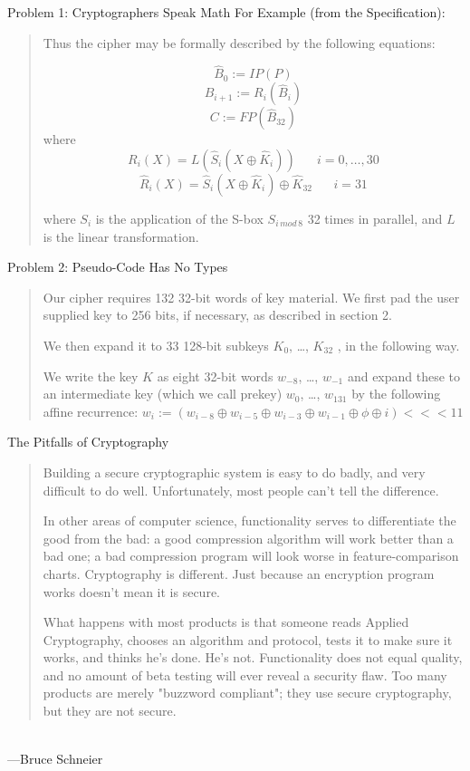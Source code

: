 \documentclass[style=sailor, mode=present]{powerdot}
\begin{document}
\begin{slide}{Problem 1: Cryptographers Speak Math}
\pause
For Example (from the Specification):\\

\blockquote{
Thus the cipher may be formally described by the following equations:

$$\hat B_0 := IP(P)$$\pause
$$B_{i+1} := R_i(\hat B_i)$$\pause
$$C := FP(\hat B_32)$$\pause
where
$$R_i (X) = L(\hat S_i (X \oplus \hat K_i )) \hspace{20pt}  i = 0, \ldots , 30$$\pause
$$ \hat R_i (X) =  \hat S_i (X \oplus \hat K_i ) \oplus \hat K_{32} \hspace{20pt} i = 31$$\pause

where $S_i$ is the application of the S-box $S_{i\hspace{2pt} mod \hspace{2pt} 8}$ 32 times in parallel, and $L$ is the linear transformation.
}\cite[3]{submission}
\end{slide}

\begin{slide}{Problem 2: Pseudo-Code Has No Types}
\pause
\blockquote{Our cipher requires 132 32-bit words of key material. We first pad the user supplied key to 256 bits, if necessary, as described in section 2. \pause
\medskip

We then expand it to 33 128-bit subkeys $K_0$, \ldots, $K_{32}$ , in the following way. \pause
\medskip

We write the key $K$ as eight 32-bit words $w_{-8}$, \ldots, $w_{-1}$ and expand these to an intermediate key (which we call prekey) $w_0$, \ldots, $w_{131}$ by the following affine recurrence:
$w_i := (w_{i-8} \oplus w_{i-5} \oplus w_{i-3} \oplus w_{i-1} \oplus \phi \oplus i) <<< 11$}\cite[7]{submission}
\end{slide}

\begin{slide}[toc=]{The Pitfalls of Cryptography}
\pause
\blockquote{Building a secure cryptographic system is easy to do badly, and very difficult to do well. Unfortunately, most people can't tell the difference. \pause
\medskip

In other areas of computer science, functionality serves to differentiate the good from the bad: a good compression algorithm will work better than a bad one; a bad compression program will look worse in feature-comparison charts. Cryptography is different. Just because an encryption program works doesn't mean it is secure.\pause
\medskip

What happens with most products is that someone reads Applied Cryptography, chooses an algorithm and protocol, tests it to make sure it works, and thinks he's done. He's not. Functionality does not equal quality, and no amount of beta testing will ever reveal a security flaw. Too many products are merely "buzzword compliant"; they use secure cryptography, but they are not secure.}  \\---Bruce Schneier \cite{Schneier:Pitfalls}
\end{slide}
\end{document}
